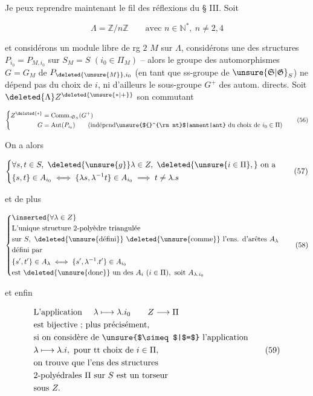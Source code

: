 
Je peux reprendre maintenant le fil des réflexions du § III. Soit

\[
\Lambda=\mathbb Z/n\mathbb Z\qquad\text{avec }n\in\mathbb N^{*},\ n\ne 2,4
\]

et considérons un module libre de rg $2$ $M$ sur $\Lambda$, considérons une des structures $P_{i_0}=P_{M,i_0}$ sur $S_M=S$ $(i_0\in\Pi_M)$ -- alors le groupe des automorphismes $G=G_M$ de $P_{\deleted{\unsure{M}},i_0}$ (en tant que ss-groupe de $\unsure{\mathfrak S|\mathfrak G}_S$) ne dépend pas du choix de $i$, ni d'ailleurs le sous-groupe $G^+$ des autom. directs. Soit $\deleted{\Lambda} Z^{\deleted{\unsure{*|+}}}$ son commutant

\[
\left\{\begin{aligned}
 Z^{\deleted{*}}&=\operatorname{Comm.}_{\mathfrak S_S}(G^+)\\
 G&=\operatorname{Aut}(P_{i_0})\qquad\text{(indépend\unsure{${}^{\rm mt}$|amment|ant} du choix de }i_0\in\Pi\text{)}
\end{aligned}\right. \tag*{(56)}
\]

On a alors

\[
\left\{\begin{aligned}
 &\forall s,t\in S,\ \deleted{\unsure{g}}\lambda\in Z,\ \deleted{\unsure{i\in\Pi},}\ \text{on a}\\
 &\{s,t\}\in A_{i_0}\iff \{\lambda s,\lambda^{-1}t\}\in A_{i_0}\implies t\ne\lambda.s
\end{aligned}\right. \tag*{(57)}
\]

et de plus

\[
\left\{\begin{aligned}
 &\inserted{\forall\lambda\in Z}\\
 &\text{L'unique structure 2-polyèdre triangulée}\\
 &\text{sur }S,\ \deleted{\text{\unsure{défini}}}\ \deleted{\text{\unsure{comme}}}\ \text{l'ens. d'arêtes }A_\lambda\\
 &\text{défini par}\\
 &\{s',t'\}\in A_\lambda\iff\{s',\lambda^{-1}.t'\}\in A_{i_0}\\
 &\text{est }\deleted{\text{\unsure{donc}}}\ \text{un des }A_i\ (i\in\Pi),\ \text{soit }A_{\lambda.i_0}
\end{aligned}\right. \tag*{(58)}
\]

et enfin

\[
\begin{aligned}
 &\text{L'application }\quad\lambda\longmapsto\lambda.i_0\qquad Z\longrightarrow\Pi\\
 &\text{est bijective ; plus précisément,}\\
 &\text{si on considère de \unsure{$\simeq$|$=$} l'application}\\
 &\lambda\longmapsto\lambda.i,\ \text{pour tt choix de }i\in\Pi,\\
 &\text{on trouve que l'ens des structures}\\
 &\text{2-polyédrales }\Pi\text{ sur }S\text{ est un torseur}\\
 &\text{sous }Z.
\end{aligned}\tag*{(59)}
\]

